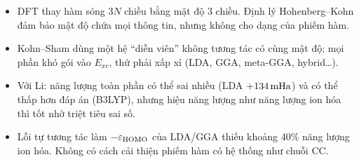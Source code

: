 \begin{ghinho}
\begin{itemize}
\item DFT thay hàm sóng $3N$ chiều bằng mật độ 3 chiều. Định lý Hohenberg--Kohn đảm bảo mật độ chứa mọi thông tin, nhưng không cho dạng của phiếm hàm.
\item Kohn--Sham dùng một hệ ``diễn viên'' không tương tác có cùng mật độ; mọi phần khó gói vào $E_{xc}$, thứ phải xấp xỉ (LDA, GGA, meta-GGA, hybrid\ldots).
\item Với Li: năng lượng toàn phần có thể sai nhiều (LDA $+134\,\mathrm{mHa}$) và có thể thấp hơn đáp án (B3LYP), nhưng hiệu năng lượng như năng lượng ion hóa thì tốt nhờ triệt tiêu sai số.
\item Lỗi tự tương tác làm $-\varepsilon_{\rm HOMO}$ của LDA/GGA thiếu khoảng 40\% năng lượng ion hóa. Không có cách cải thiện phiếm hàm có hệ thống như chuỗi CC.
\end{itemize}
\end{ghinho}
